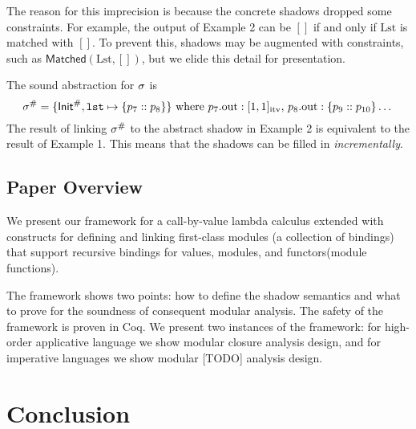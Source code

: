 \documentclass{article}
\begin{document}
The reason for this imprecision is because the concrete shadows dropped some constraints.
For example, the output of Example 2 can be $[]$ if and only if
$\text{Lst}$ is matched with $[]$. To prevent this, shadows may be augmented with
constraints, such as $\textsf{Matched}(\text{Lst},[])$, but we elide this detail
for presentation.

The sound abstraction for $\sigma$ is
\[
  {\sigma}^{\#}=\{{\mathsf{Init}}^{\#},\texttt{lst}\mapsto\{p_7::p_8\}\}
  \text{ where }
  p_7.\text{out}:[1,1]_{\text{itv}}
  \text{, }
  p_8.\text{out}:\{p_9::p_{10}\}\dots
\]
The result of linking ${\sigma}^{\#}$ to the abstract shadow in Example 2
is equivalent to the result of Example 1. This means that the
shadows can be filled in \emph{incrementally}.

\subsection{Paper Overview}
We present our framework for a call-by-value lambda calculus extended
with constructs for defining and linking first-class modules (a
collection of bindings) that support recursive bindings for values,
modules, and functors(module functions).

The framework shows two points: how to define the shadow semantics and
what to prove for the soundness of consequent modular analysis. The
safety of the framework is proven in Coq. We present two instances of the
framework: for high-order applicative language we show modular
closure analysis design, and for imperative languages we show modular
  [TODO] analysis design.

\clearpage

\clearpage

\clearpage


\section{Conclusion}
\end{document}
